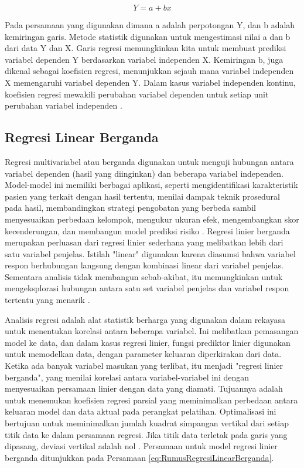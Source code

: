 \begin{equation}
  \label{eq:RumusRegresiLinearSederhana}
  Y = a + bx
\end{equation}

Pada persamaan yang digunakan dimana a adalah perpotongan Y, dan b adalah kemiringan garis. Metode statistik digunakan untuk mengestimasi nilai a dan b dari data Y dan X. Garis regresi memungkinkan kita untuk membuat prediksi variabel dependen Y berdasarkan variabel independen X. Kemiringan b, juga dikenal sebagai koefisien regresi, menunjukkan sejauh mana variabel independen X memengaruhi variabel dependen Y. Dalam kasus variabel independen kontinu, koefisien regresi mewakili perubahan variabel dependen untuk setiap unit perubahan variabel independen \parencite{Schneider}.

\subsection{Regresi Linear Berganda}
\label{subsec:regresilinearberganda}

Regresi multivariabel atau berganda digunakan untuk menguji hubungan antara variabel dependen (hasil yang diinginkan) dan beberapa variabel independen. Model-model ini memiliki berbagai aplikasi, seperti mengidentifikasi karakteristik pasien yang terkait dengan hasil tertentu, menilai dampak teknik prosedural pada hasil, membandingkan strategi pengobatan yang berbeda sambil menyesuaikan perbedaan kelompok, mengukur ukuran efek, mengembangkan skor kecenderungan, dan membangun model prediksi risiko \parencite{Grant}. Regresi linier berganda merupakan perluasan dari regresi linier sederhana yang melibatkan lebih dari satu variabel penjelas. Istilah "linear" digunakan karena diasumsi bahwa variabel respon berhubungan langsung dengan kombinasi linear dari variabel penjelas. Sementara analisis tidak membangun sebab-akibat, itu memungkinkan untuk mengeksplorasi hubungan antara satu set variabel penjelas dan variabel respon tertentu yang menarik \parencite{Tranmer}.

Analisis regresi adalah alat statistik berharga yang digunakan dalam rekayasa untuk menentukan korelasi antara beberapa variabel. Ini melibatkan pemasangan model ke data, dan dalam kasus regresi linier, fungsi prediktor linier digunakan untuk memodelkan data, dengan parameter keluaran diperkirakan dari data. Ketika ada banyak variabel masukan yang terlibat, itu menjadi "regresi linier berganda", yang menilai korelasi antara variabel-variabel ini dengan menyesuaikan persamaan linier dengan data yang diamati. Tujuannya adalah untuk menemukan koefisien regresi parsial yang meminimalkan perbedaan antara keluaran model dan data aktual pada perangkat pelatihan. Optimalisasi ini bertujuan untuk meminimalkan jumlah kuadrat simpangan vertikal dari setiap titik data ke dalam persamaan regresi. Jika titik data terletak pada garis yang dipasang, deviasi vertikal adalah nol \parencite{Khademi}. Persamaan untuk model regresi linier berganda ditunjukkan pada Persamaan \ref{eq:RumusRegresiLinearBerganda}.

